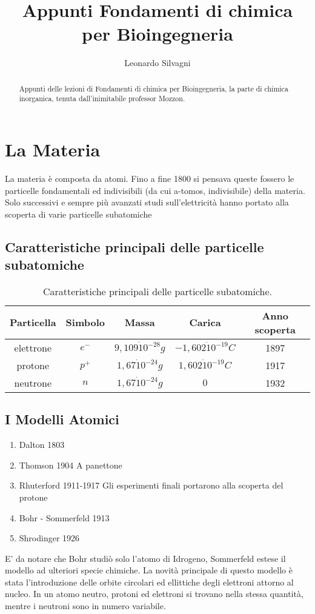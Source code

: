 \documentclass{article}
\title{Appunti Fondamenti di chimica per Bioingegneria}
\author{Leonardo Silvagni}
\begin{document}
\maketitle

\begin{abstract}
Appunti delle lezioni di Fondamenti di chimica per Bioingegneria, la parte di chimica
inorganica, tenuta dall'inimitabile professor Mozzon. 
\end{abstract}

\section{La Materia}
La materia è composta da atomi. Fino a fine 1800 si pensava queste fossero le particelle fondamentali ed indivisibili (da cui a-tomos, indivisibile) della materia.  
Solo successivi e sempre più avanzati studi sull'elettricità hanno portato alla scoperta di varie particelle subatomiche
\subsection{Caratteristiche principali delle particelle subatomiche}

\begin{table}[H]
\centering
\begin{tabular}{c|c|c|c|c}
Particella & Simbolo & Massa & Carica & Anno scoperta \\\hline
elettrone & $e^-$ & $9,109\dot 10^{-28}g$ & $-1,602\dot 10^{-19}C$ & 1897 \\
protone & $p^+$ & $1,67\dot 10^{-24}g$ & $1,602\dot 10^{-19}C$ & 1917 \\
neutrone & $n$ & $1,67\dot 10^{-24}g$ & $0$ & 1932 
\end{tabular}
\caption{\label{tab:widgets}Caratteristiche principali delle particelle subatomiche.}
\end{table}
\subsection{I Modelli Atomici}
\begin{enumerate}
\item Dalton    1803
\item Thomson   1904 A panettone
\item Rhuterford    1911-1917 Gli esperimenti finali portarono alla scoperta del protone
\item Bohr - Sommerfeld     1913
\item Shrodinger    1926
\end{enumerate}
E' da notare che Bohr studiò solo l'atomo di Idrogeno, Sommerfeld estese il modello ad ulteriori specie chimiche. La novità principale di questo modello è stata l'introduzione delle orbite circolari ed ellittiche degli elettroni attorno al nucleo. 
In un atomo neutro, protoni ed elettroni si trovano nella stessa quantità, mentre i neutroni sono in numero variabile.
\end{document}
